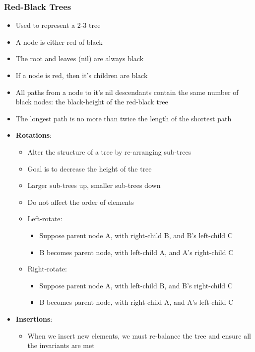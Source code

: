 \documentclass{article}
\begin{document}
\subsubsection{Red-Black Trees}

\begin{itemize}
    \item Used to represent a 2-3 tree
    \item A node is either red of black
    \item The root and leaves (nil) are always black
    \item If a node is red, then it's children are black
    \item All paths from a node to it's nil descendants contain the same number of black nodes: the black-height of the red-black tree
    \item The longest path is no more than twice the length of the shortest path
    \item \textbf{Rotations}:
    \begin{itemize}
        \item Alter the structure of a tree by re-arranging sub-trees
        \item Goal is to decrease the height of the tree
        \item Larger sub-trees up, smaller sub-trees down
        \item Do not affect the order of elements
        \item Left-rotate:
        \begin{itemize}
            \item Suppose parent node A, with right-child B, and B's left-child C
            \item B becomes parent node, with left-child A, and A's right-child C
        \end{itemize}
        \item Right-rotate:
        \begin{itemize}
            \item Suppose parent node A, with left-child B, and B's right-child C
            \item B becomes parent node, with right-child A, and A's left-child C
        \end{itemize}
    \end{itemize}
    \item \textbf{Insertions}:
    \begin{itemize}
        \item When we insert new elements, we must re-balance the tree and ensure all the invariants are met

\end{itemize}
\end{itemize}
\end{document}
